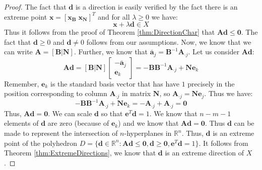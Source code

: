 \begin{proof} The fact that $\mathbf{d}$ is a direction is easily verified by the fact there is an extreme point $\mathbf{x} = [\mathbf{x_B} \; \mathbf{x_N}]^T$ and for all $\lambda \geq 0$ we have:
\begin{equation}
\mathbf{x} + \lambda \mathbf{d} \in X
\end{equation}
Thus it follows from the proof of Theorem \ref{thm:DirectionChar} that $\mathbf{A}\mathbf{d} \leq \mathbf{0}$. The fact that $\mathbf{d} \geq 0$ and $\mathbf{d} \neq 0$ follows from our assumptions. Now, we know that we can write $\mathbf{A} = [\mathbf{B} | \mathbf{N}]$. Further, we know that  $\overline{\mathbf{a}}_j = \mathbf{B}^{-1}\mathbf{A}_{\cdot j}$. Let us consider $\mathbf{A}\mathbf{d}$:
\begin{equation}
\mathbf{A}\mathbf{d} = [\mathbf{B} | \mathbf{N}]\begin{bmatrix}
-\overline{\mathbf{a}}_j\\
\mathbf{e}_k
\end{bmatrix} = 
-\mathbf{B}\mathbf{B}^{-1}\mathbf{A}_{\cdot j} + \mathbf{N}\mathbf{e}_k
\end{equation}
Remember, $\mathbf{e}_k$ is the standard basis vector that has have $1$ precisely in the position corresponding to column $\mathbf{A}_{\cdot j}$ in matrix $\mathbf{N}$, so $\mathbf{A}_{\cdot j} = \mathbf{N} \mathbf{e}_j$. Thus we have:
\begin{equation}
-\mathbf{B}\mathbf{B}^{-1}\mathbf{A}_{\cdot j} + \mathbf{N}\mathbf{e}_k = 
-\mathbf{A}_{\cdot j} + \mathbf{A}_{\cdot j} = \mathbf{0}
\end{equation}
Thus, $\mathbf{A}\mathbf{d} = \mathbf{0}$. We can scale $\mathbf{d}$ so that $\mathbf{e}^T\mathbf{d} = 1$. We know that $n-m-1$ elements of $\mathbf{d}$ are zero (because of $\mathbf{e}_k$) and we know that $\mathbf{A}\mathbf{d} = \mathbf{0}$. Thus $\mathbf{d}$ can be made to represent the intersection of $n$-hyperplanes in $\mathbb{R}^n$. Thus, $\mathbf{d}$ is an extreme point of the polyhedron $D = \{\mathbf{d} \in \mathbb{R}^n : \mathbf{A}\mathbf{d} \leq \mathbf{0}, \mathbf{d}\geq \mathbf{0},\mathbf{e}^T\mathbf{d} = 1\}$. It follows from Theorem \ref{thm:ExtremeDirections}, we know that $\mathbf{d}$ is an extreme direction of $X$. 
\end{proof}

